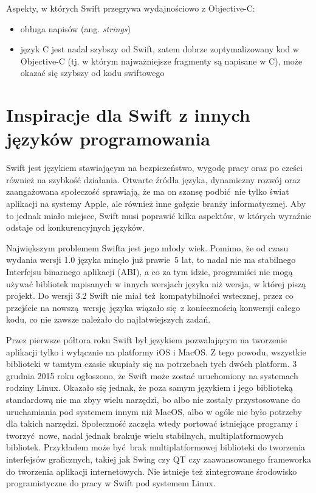 \documentclass[mgr, shortabstract]{iithesis}
\newcommand{\ang}[1]{ang. \textit{#1}}
\begin{document}
Aspekty, w których Swift przegrywa wydajnościowo z Objective-C:
\begin{itemize}
    \item obługa napisów (\ang{strings})
    \item język C jest nadal szybszy od Swift, zatem dobrze zoptymalizowany kod w Objective-C (tj. w którym najważniejsze fragmenty są napisane w C), może okazać się szybszy od kodu swiftowego
\end{itemize}

\section{Inspiracje dla Swift z innych języków programowania}

Swift jest językiem stawiającym na bezpiczeństwo, wygodę pracy oraz po cześci również na szybkość działania. Otwarte źródła języka, dynamiczny rozwój oraz zaangażowana społeczość sprawiają, że ma on szansę podbić nie tylko świat aplikacji na systemy Apple, ale również inne gałęzie branży informatycznej. Aby to jednak miało miejsce, Swift musi poprawić kilka aspektów, w których wyraźnie odstaje od konkurencyjnych języków.

Największym problemem Swifta jest jego młody wiek. Pomimo, że od czasu wydania wersji 1.0 języka minęło już prawie 5 lat, to nadal nie ma stabilnego Interfejsu binarnego aplikacji (ABI), a co za tym idzie, programiści nie mogą używać bibliotek napisanych w innych wersjach języka niż wersja, w której piszą projekt. Do wersji 3.2 Swift nie miał też kompatybilności wstecznej, przez co przejście na nowszą wersję języka wiązało się z koniecznością konwersji całego kodu, co nie zawsze należało do najłatwiejszych zadań.

Przez pierwsze półtora roku Swift był językiem pozwalającym na tworzenie aplikacji tylko i wyłącznie na platformy iOS i MacOS. Z tego powodu, wszystkie biblioteki w tamtym czasie skupiały się na potrzebach tych dwóch platform. 3 grudnia 2015 roku ogłoszono, że Swift może zostać uruchomiony na systemach rodziny Linux. Okazało się jednak, że poza samym językiem i jego biblioteką standardową nie ma zbyy wielu narzędzi, bo albo nie zostały przystosowane do uruchamiania pod systemem innym niż MacOS, albo w ogóle nie było potrzeby dla takich narzędzi. Społeczność zaczęła wtedy portować istniejące programy i tworzyć nowe, nadal jednak brakuje wielu stabilnych, multiplatformowych bibliotek. Przykładem może być brak multiplatformowej biblioteki do tworzenia interfejsów graficznych, takiej jak Swing czy QT czy zaawansowanego frameworka do tworzenia aplikacji internetowych. Nie istnieje też zintegrowane środowisko programistyczne do pracy w Swift pod systemem Linux.
\end{document}
